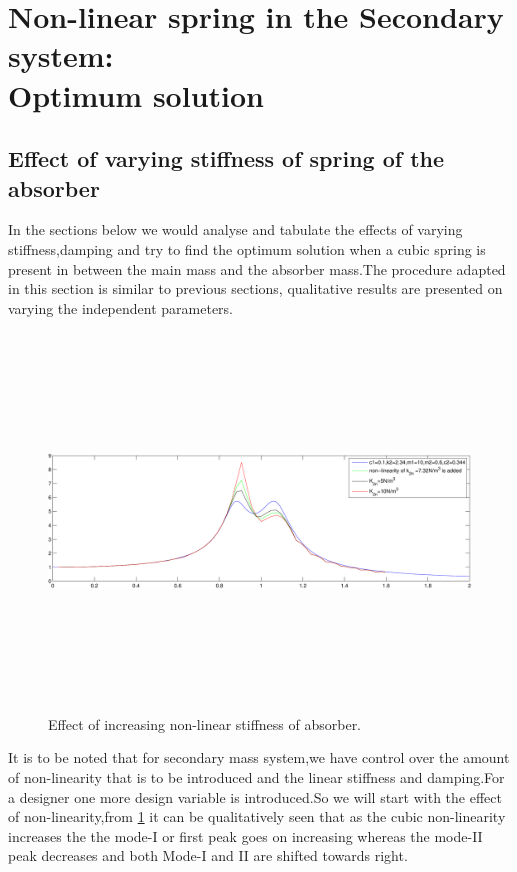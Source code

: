 \section{Non-linear spring in the Secondary system:\\ Optimum solution}
\subsection{Effect of varying stiffness of spring of the absorber }
In the sections below we would analyse and tabulate the effects of varying stiffness,damping and try to find the optimum solution when a cubic spring is present in between the main mass and the absorber mass.The procedure adapted in this section is similar to previous sections, qualitative results are presented on varying the independent parameters.
\begin{figure}[h!]
\includegraphics[width=16cm,height=10cm]{"figures/nonlinearity_secondary_1"}
  \caption{Effect of increasing non-linear stiffness of absorber.}
  \label{fig:non-linear secondary 1}
  \end{figure}

It is to be noted that for secondary mass system,we have control over the amount of non-linearity that is to be introduced and the linear stiffness and damping.For a designer one more design variable is introduced.So we will start with the effect of non-linearity,from \ref{fig:non-linear secondary 1} it can be qualitatively seen that as the cubic non-linearity increases the the mode-I or first peak goes on increasing whereas the mode-II peak decreases and both Mode-I and II are shifted towards right.\\

